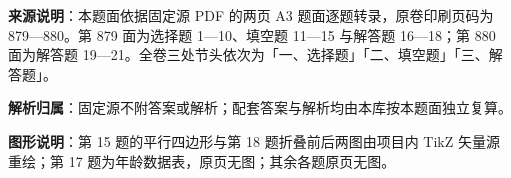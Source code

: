 

\begin{gknotice}
\textbf{来源说明}：本题面依据固定源 PDF 的两页 A3 题面逐题转录，原卷印刷页码为 879—880。第 879 面为选择题 1—10、填空题 11—15 与解答题 16—18；第 880 面为解答题 19—21。全卷三处节头依次为「一、选择题」「二、填空题」「三、解答题」。

\textbf{解析归属}：固定源不附答案或解析；配套答案与解析均由本库按本题面独立复算。

\textbf{图形说明}：第 15 题的平行四边形与第 18 题折叠前后两图由项目内 TikZ 矢量源重绘；第 17 题为年龄数据表，原页无图；其余各题原页无图。
\end{gknotice}



